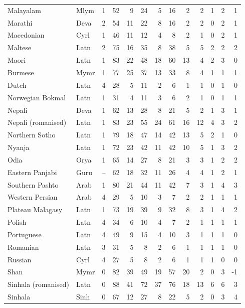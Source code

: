 \begin{small}
\begin{longtable}{llrrrrrrrrrrr}
Malayalam & Mlym & 1 & 52 & 9 & 24 & 5 & 16 & 2 & 2 & 1 & 2 & 1 \\
Marathi & Deva & 2 & 54 & 11 & 22 & 8 & 16 & 2 & 2 & 0 & 2 & 1 \\
Macedonian & Cyrl & 1 & 46 & 11 & 12 & 4 & 8 & 2 & 1 & 0 & 2 & 1 \\
Maltese & Latn & 2 & 75 & 16 & 35 & 8 & 38 & 5 & 5 & 2 & 2 & 2 \\
Maori & Latn & 1 & 83 & 22 & 48 & 18 & 60 & 13 & 4 & 2 & 3 & 0 \\
Burmese & Mymr & 1 & 77 & 25 & 37 & 13 & 33 & 8 & 4 & 1 & 1 & 1 \\
Dutch & Latn & 4 & 28 & 5 & 11 & 2 & 6 & 1 & 1 & 0 & 1 & 0 \\
Norwegian Bokmal & Latn & 1 & 31 & 4 & 11 & 3 & 6 & 2 & 1 & 0 & 1 & 1 \\
Nepali & Deva & 1 & 62 & 13 & 28 & 8 & 21 & 5 & 2 & 1 & 3 & 1 \\
Nepali (romanised) & Latn & 1 & 83 & 23 & 55 & 24 & 61 & 16 & 12 & 4 & 3 & 2 \\
Northern Sotho & Latn & 1 & 79 & 18 & 47 & 14 & 42 & 13 & 5 & 2 & 1 & 0 \\
Nyanja & Latn & 1 & 72 & 23 & 42 & 11 & 42 & 10 & 5 & 1 & 3 & 2 \\
Odia & Orya & 1 & 65 & 14 & 27 & 8 & 21 & 3 & 3 & 1 & 2 & 2 \\
Eastern Panjabi & Guru & -- & 62 & 18 & 32 & 11 & 26 & 4 & 4 & 1 & 2 & 1 \\
Southern Pashto & Arab & 1 & 80 & 21 & 44 & 11 & 42 & 7 & 3 & 1 & 4 & 3 \\
Western Persian & Arab & 4 & 29 & 5 & 10 & 3 & 7 & 2 & 2 & 1 & 1 & 1 \\
Plateau Malagasy & Latn & 1 & 73 & 19 & 39 & 9 & 32 & 8 & 3 & 1 & 4 & 2 \\
Polish & Latn & 4 & 34 & 6 & 10 & 4 & 7 & 2 & 1 & 1 & 1 & 1 \\
Portuguese & Latn & 4 & 49 & 9 & 15 & 4 & 10 & 3 & 1 & 1 & 1 & 0 \\
Romanian & Latn & 3 & 31 & 5 & 8 & 2 & 6 & 1 & 1 & 1 & 1 & 0 \\
Russian & Cyrl & 4 & 27 & 5 & 8 & 2 & 6 & 1 & 1 & 1 & 0 & 0 \\
Shan & Mymr & 0 & 82 & 39 & 49 & 19 & 57 & 20 & 2 & 0 & 3 & -1 \\
Sinhala (romanised) & Latn & 0 & 88 & 41 & 72 & 37 & 76 & 18 & 13 & 6 & 6 & 3 \\
Sinhala & Sinh & 0 & 67 & 12 & 27 & 8 & 22 & 5 & 2 & 0 & 3 & 4 \\

\end{longtable}
\end{small}
